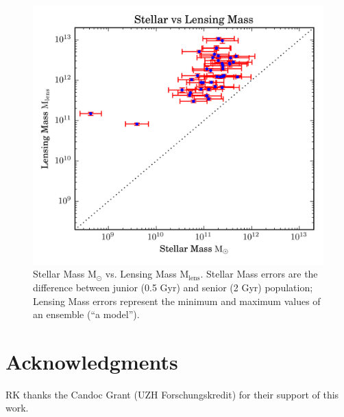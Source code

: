 \documentclass{ws-procs975x65}
\newcommand{\Mlens}{\ensuremath{\text{M}_\text{lens}}\xspace}
\newcommand{\Mstel}{\ensuremath{\text{M}_\odot}\xspace}
\begin{document}
\begin{figure}
  \centering
  \includegraphics[width=0.8\columnwidth]{img/plot}
  \caption{Stellar Mass \Mstel vs. Lensing Mass \Mlens. Stellar Mass errors are the difference between junior (0.5 Gyr) and senior (2 Gyr) population; Lensing Mass errors represent the minimum and maximum values of an ensemble (``a model'').}
  \label{fig:frac}
\end{figure}


\section*{Acknowledgments}
RK thanks the Candoc Grant (UZH Forschungskredit) for their support of this work.



\end{document}
